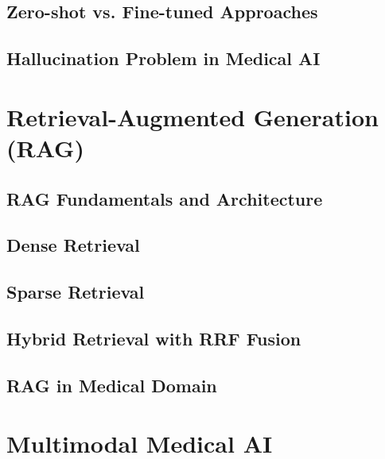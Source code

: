 \subsection{Zero-shot vs. Fine-tuned Approaches}
\label{subsec:background:llm:approaches}

\subsection{Hallucination Problem in Medical AI}
\label{subsec:background:llm:hallucination}

%
%
\section{Retrieval-Augmented Generation (RAG)}
\label{sec:background:rag}

\subsection{RAG Fundamentals and Architecture}
\label{subsec:background:rag:fundamentals}

\subsection{Dense Retrieval}
\label{subsec:background:rag:dense}

\subsection{Sparse Retrieval}
\label{subsec:background:rag:sparse}

\subsection{Hybrid Retrieval with RRF Fusion}
\label{subsec:background:rag:hybrid}

\subsection{RAG in Medical Domain}
\label{subsec:background:rag:medical}

%
%
\section{Multimodal Medical AI}
\label{sec:background:multimodal}

